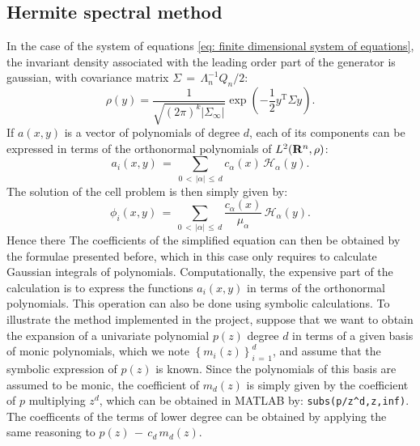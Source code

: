 \subsection{Hermite spectral method}
\label{sub:Hermite spectral method}
In the case of the system of equations \eqref{eq: finite dimensional system of equations}, the invariant density associated with the leading order part of the generator is gaussian, with covariance matrix $\Sigma \,=\, \Lambda_n^{-1} Q_n /2$:
\begin{equation*}
    \rho(y)= \frac{1}{\sqrt{(2\pi)^k| \Sigma_\infty|}}\exp\left(-\frac{1}{2}y^\mathrm{T}\Sigma y \right).
\end{equation*}
If $a(x,y)$ is a vector of polynomials of degree $d$, each of its components can be expressed in terms of the orthonormal polynomials of $L^{2}(\mathbf R^n,\rho)$: 
\begin{equation*}
    a_i(x,y) \,=\, \sum_{0\,<\,|\alpha|\,\leq\,d} c_{\alpha} (x) \, \mathcal H_{\alpha}(y). 
\end{equation*}
The solution of the cell problem is then simply given by:
\begin{equation*}
    \phi_i(x,y) \,=\,\sum_{0 \,<\,|\alpha| \,\leq\, d} \frac{c_\alpha(x)}{\mu_\alpha}\,   \mathcal H_{\alpha}(y). 
\end{equation*}
Hence there The coefficients of the simplified equation can then be obtained by the formulae presented before, which in this case only requires to calculate Gaussian integrals of polynomials.
Computationally, the expensive part of the calculation is to express the functions $a_i(x,y)$ in terms of the orthonormal polynomials.
This operation can also be done using symbolic calculations. To illustrate the method implemented in the project, suppose that we want to obtain the expansion of a univariate polynomial $p(z)$ degree $d$ in terms of a given basis of monic polynomials, which we note $\left\{m_i(z)\right\}_{ i\,=\,1}^{ d}$, and assume that the symbolic expression of $p(z)$ is known.
Since the polynomials of this basis are assumed to be monic, the coefficient of $m_d(z)$ is simply given by the coefficient of $p$ multiplying $z^d$, which can be obtained in MATLAB by: \verb?subs(p/z^d,z,inf)?. The coefficents of the terms of lower degree can be obtained by applying the same reasoning to $p(z) \,-\,c_d\,m_d(z)$.

